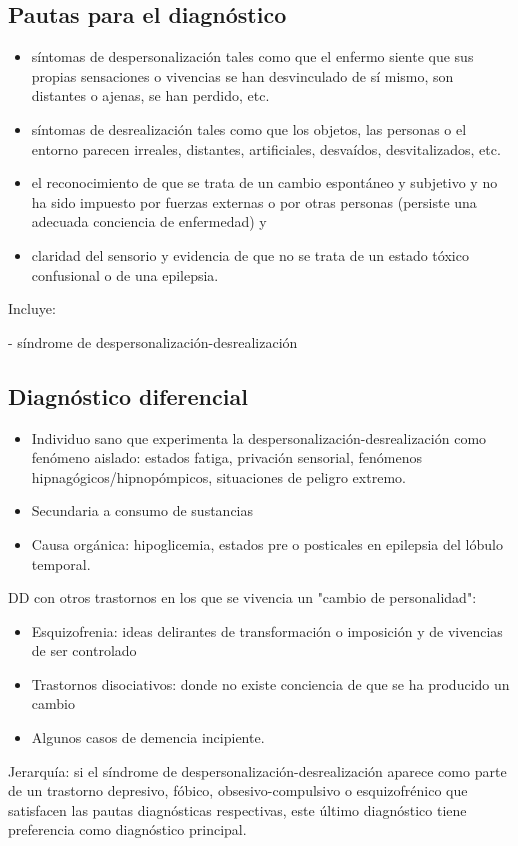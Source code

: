 \documentclass{scrbook}
\begin{document}
\subsection*{Pautas para el diagnóstico}
\begin{itemize}
    \item síntomas de despersonalización tales como que el enfermo siente que sus propias sensaciones o vivencias se han desvinculado de sí mismo, son distantes o ajenas, se han perdido, etc.
    \item síntomas de desrealización tales como que los objetos, las personas o el entorno parecen irreales, distantes, artificiales, desvaídos, desvitalizados, etc.
    \item el reconocimiento de que se trata de un cambio espontáneo y subjetivo y no ha sido impuesto por fuerzas externas o por otras personas (persiste una adecuada conciencia de enfermedad) y
    \item claridad del sensorio y evidencia de que no se trata de un estado tóxico confusional o de una epilepsia.
\end{itemize}
Incluye:

- síndrome de despersonalización-desrealización
\subsection*{Diagnóstico diferencial}
\begin{itemize}
    \item Individuo sano que experimenta la despersonalización-desrealización como fenómeno aislado: estados fatiga, privación sensorial, fenómenos hipnagógicos/hipnopómpicos, situaciones de peligro extremo.
    \item Secundaria a consumo de sustancias
    \item Causa orgánica: hipoglicemia, estados pre o posticales en epilepsia del lóbulo temporal.
\end{itemize}
DD con otros trastornos en los que se vivencia un "cambio de personalidad":
\begin{itemize}
    \item Esquizofrenia: ideas delirantes de transformación o imposición y de vivencias de ser controlado
    \item Trastornos disociativos: donde no existe conciencia de que se ha producido un cambio
    \item Algunos casos de demencia incipiente.
\end{itemize}
Jerarquía: si el síndrome de despersonalización-desrealización aparece como parte de un trastorno depresivo, fóbico, obsesivo-compulsivo o esquizofrénico que satisfacen las pautas diagnósticas respectivas, este último diagnóstico tiene preferencia como diagnóstico principal.
\end{document}
